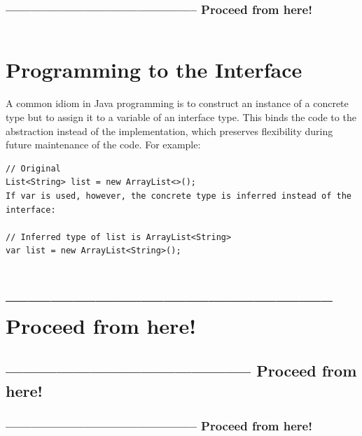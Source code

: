 \subsubsection{-------------------------------------------- Proceed from here!}
\lipsum[5]

\begin{lstlisting}
\end{lstlisting}


\section{Programming to the Interface}\label{sec:ProgrammingToTheInterface}
A common idiom in Java programming is to construct an instance of a concrete type but to assign it to a variable of an interface type. This binds the code to the abstraction instead of the implementation, which preserves flexibility during future maintenance of the code. For example:

\begin{lstlisting}
// Original
List<String> list = new ArrayList<>();
If var is used, however, the concrete type is inferred instead of the interface:

// Inferred type of list is ArrayList<String>
var list = new ArrayList<String>();
\end{lstlisting}

\section{-------------------------------------------- Proceed from here!}
\subsection{-------------------------------------------- Proceed from here!}
\subsubsection{-------------------------------------------- Proceed from here!}
\autocite{Cymerman:SmarterJavaDevelopment}
\autocite{Fejer:ProgramToInterfaces}
\autocite{Pavlutin:ProgrammingToInterface}

\begin{lstlisting}
\end{lstlisting}

